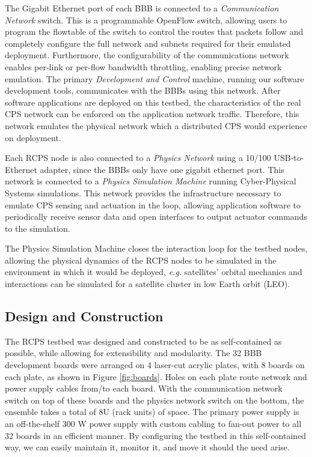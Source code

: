 The Gigabit Ethernet port of each BBB is connected to a \emph{Communication Network} switch. This is a programmable OpenFlow \cite{openflow} switch, allowing users to program the flowtable of the switch to control the routes that packets follow and completely configure the full network and subnets required for their emulated deployment.  Furthermore, the configurability of the communications network enables per-link or per-flow bandwidth throttling, enabling precise network emulation.  The primary \emph{Development and Control} machine, running our software development tools, communicates with the BBBs using this network. After software applications are deployed on this testbed, the characteristics of the real CPS network can be enforced on the application network traffic. Therefore, this network emulates the physical network which a distributed CPS would experience on deployment.

Each RCPS node is also connected to a \emph{Physics Network} using a 10/100 USB-to-Ethernet adapter, since the BBBs only have one gigabit ethernet port. This network is connected to a \emph{Physics Simulation Machine} running Cyber-Physical Systems simulations. This network provides the infrastructure necessary to emulate CPS sensing and actuation in the loop, allowing application software to periodically receive sensor data and open interfaces to output actuator commands to the simulation.

The Physics Simulation Machine closes the interaction loop for the testbed nodes, allowing the physical dynamics of the RCPS nodes to be simulated in the environment in which it would be deployed, \emph{e.g.} satellites' orbital mechanics and interactions can be simulated for a satellite cluster in low Earth orbit (LEO). 

\subsection{Design and Construction}

The RCPS testbed was designed and constructed to be as self-contained as possible, while allowing for extensibility and modularity. The 32 BBB development boards were arranged on 4 laser-cut acrylic plates, with 8 boards on each plate, as shown in Figure \ref{fig:boards}. Holes on each plate route network and power supply cables from/to each board. With the communication network switch on top of these boards and the physics network switch on the bottom, the ensemble takes a total of 8U (rack units) of space. The primary power supply is an off-the-shelf 300 W power supply with custom cabling to fan-out power to all 32 boards in an efficient manner.  By configuring the testbed in this self-contained way, we can easily maintain it, monitor it, and move it should the need arise.  

